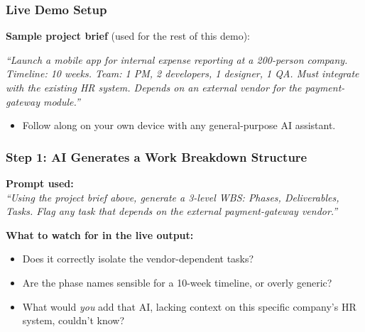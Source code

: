 \begin{frame}[fragile]\frametitle{Live Demo Setup}

\textbf{Sample project brief} (used for the rest of this demo):

\vspace{0.3em}
\textit{``Launch a mobile app for internal expense reporting at a 200-person company. Timeline: 10 weeks. Team: 1 PM, 2 developers, 1 designer, 1 QA. Must integrate with the existing HR system. Depends on an external vendor for the payment-gateway module.''}

\vspace{0.5em}
\begin{itemize}
  \item Follow along on your own device with any general-purpose AI assistant.
\end{itemize}

\end{frame}

\begin{frame}[fragile]\frametitle{Step 1: AI Generates a Work Breakdown Structure}

\textbf{Prompt used:}\\
\textit{``Using the project brief above, generate a 3-level WBS: Phases, Deliverables, Tasks. Flag any task that depends on the external payment-gateway vendor.''}

\vspace{0.3em}
\textbf{What to watch for in the live output:}
\begin{itemize}
  \item Does it correctly isolate the vendor-dependent tasks?
  \item Are the phase names sensible for a 10-week timeline, or overly generic?
  \item What would \textit{you} add that AI, lacking context on this specific company's HR system, couldn't know?
\end{itemize}

\end{frame}

